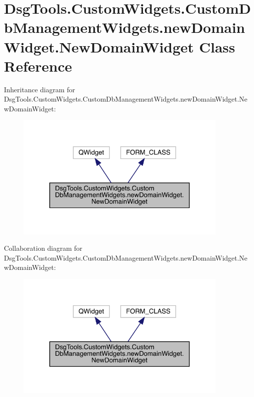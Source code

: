 \hypertarget{class_dsg_tools_1_1_custom_widgets_1_1_custom_db_management_widgets_1_1new_domain_widget_1_1_new_domain_widget}{}\section{Dsg\+Tools.\+Custom\+Widgets.\+Custom\+Db\+Management\+Widgets.\+new\+Domain\+Widget.\+New\+Domain\+Widget Class Reference}
\label{class_dsg_tools_1_1_custom_widgets_1_1_custom_db_management_widgets_1_1new_domain_widget_1_1_new_domain_widget}


Inheritance diagram for Dsg\+Tools.\+Custom\+Widgets.\+Custom\+Db\+Management\+Widgets.\+new\+Domain\+Widget.\+New\+Domain\+Widget\+:
\nopagebreak
\begin{figure}[H]
\begin{center}
\leavevmode
\includegraphics[width=293pt]{class_dsg_tools_1_1_custom_widgets_1_1_custom_db_management_widgets_1_1new_domain_widget_1_1_new_domain_widget__inherit__graph}
\end{center}
\end{figure}


Collaboration diagram for Dsg\+Tools.\+Custom\+Widgets.\+Custom\+Db\+Management\+Widgets.\+new\+Domain\+Widget.\+New\+Domain\+Widget\+:
\nopagebreak
\begin{figure}[H]
\begin{center}
\leavevmode
\includegraphics[width=293pt]{class_dsg_tools_1_1_custom_widgets_1_1_custom_db_management_widgets_1_1new_domain_widget_1_1_new_domain_widget__coll__graph}
\end{center}
\end{figure}
